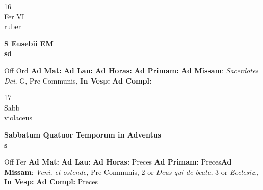 \documentclass[10pt, openany]{book}
\begin{document}
    \begin{center}
        \begin{minipage}{3.5in}
            \vspace{2em}
            \begin{minipage}{0.5in}
                {\Huge 16} \\
                {\normalsize Fer VI} \\
                {\normalsize ruber}
            \end{minipage}
            \begin{minipage}{3.0in}
                \textbf{ \large S Eusebii EM \\
                \textnormal{\normalsize sd}} \\ 
            \end{minipage}
            \begin{justify}Off Ord
                \textbf{Ad Mat: }
                \textbf{Ad Lau: }
                \textbf{Ad Horas: }
                \textbf{Ad Primam: }\textbf{Ad Missam}: \textit{Sacerdotes Dei,} G, Pre Communis,  
                \textbf{In Vesp: }
                \textbf{Ad Compl: }
            \end{justify}
        \end{minipage}
    \end{center}

    \begin{center}
        \begin{minipage}{3.5in}
            \vspace{2em}
            \begin{minipage}{0.5in}
                {\Huge 17} \\
                {\normalsize Sabb} \\
                {\normalsize violaceus}
            \end{minipage}
            \begin{minipage}{3.0in}
                \textbf{ \large Sabbatum Quatuor Temporum in Adventus \\
                \textnormal{\normalsize s}} \\ 
            \end{minipage}
            \begin{justify}Off Fer
                \textbf{Ad Mat: }
                \textbf{Ad Lau: }
                \textbf{Ad Horas: }Preces
                \textbf{Ad Primam: }Preces\textbf{Ad Missam}: \textit{Veni, et ostende,} Pre Communis, 2 or \textit{Deus qui de beate,} 3 or \textit{Ecclesiæ,}  
                \textbf{In Vesp: }
                \textbf{Ad Compl: }Preces
            \end{justify}
        \end{minipage}
    \end{center}
\end{document}
